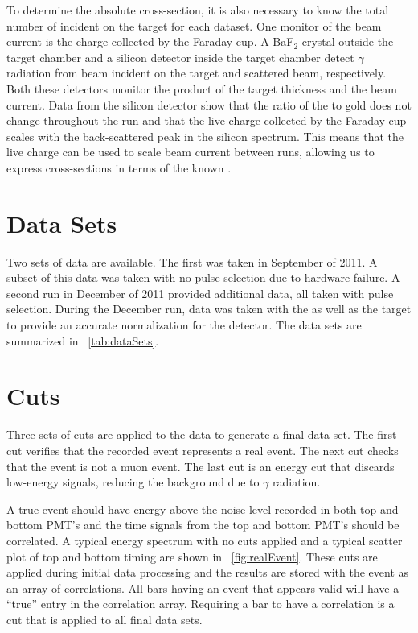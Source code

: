 To determine the absolute cross-section, it is also necessary to know the total number of  incident on the target for each dataset.  One monitor of the beam current is the charge collected by the Faraday cup.  A BaF$_2$ crystal outside the target chamber and a silicon detector inside the target chamber detect $\gamma$ radiation from beam incident on the target and scattered  beam, respectively.  Both these detectors monitor the product of the target thickness and the beam current.  Data from the silicon detector show that the ratio of the \GeTargets to gold does not change throughout the run and that the live charge collected by the Faraday cup scales with the back-scattered peak in the silicon spectrum.  This means that the live charge can be used to scale beam current between runs, allowing us to express \reaction cross-sections in terms of the known \MgReaction.

\section{Data Sets}
Two sets of \reaction data are available.  The first was taken in September of 2011.  A subset of this data was taken with no pulse selection due to hardware failure.  A second run in December of 2011 provided additional data, all taken with pulse selection.  During the December run, data was taken with the \GeTargets as well as the  target to provide an accurate normalization for the detector.  The data sets are summarized in {\tab}~\ref{tab:dataSets}.

\section{Cuts}
Three sets of cuts are applied to the data to generate a final data set.  The first cut verifies that the recorded event represents a real event.  The next cut checks that the event is not a muon event.  The last cut is an energy cut that discards low-energy signals, reducing the background due to $\gamma$ radiation.

A true event should have energy above the noise level recorded in both top and bottom PMT's and the time signals from the top and bottom PMT's should be correlated.  A typical energy spectrum with no cuts applied and a typical scatter plot of top and bottom timing are shown in {\fig}~\ref{fig:realEvent}.  These cuts are applied during initial data processing and the results are stored with the event as an array of correlations.  All bars having an event that appears valid will have a ``true'' entry in the correlation array.  Requiring a bar to have a correlation is a cut that is applied to all final data sets.

